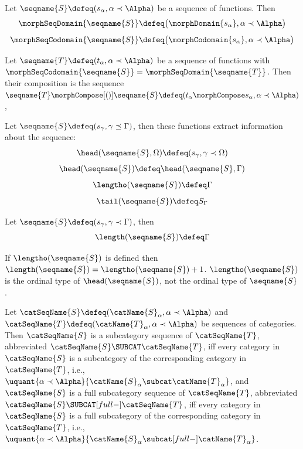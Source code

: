 \documentclass{article}
\begin{document}
\begin{definition}
Let $\seqname{S} \defeq (s_\alpha, \alpha \prec \Alpha)$ be a sequence
of functions. Then
\begin{equation}
\morphSeqDomain{\seqname{S}} \defeq \bigl ( \morphDomain{s_\alpha}, \alpha \prec \Alpha \bigr )
\end{equation}
\begin{equation}
\morphSeqCodomain{\seqname{S}} \defeq \bigl ( \morphCodomain{s_\alpha}, \alpha \prec \Alpha \bigr )
\end{equation}

Let $\seqname{T} \defeq (t_\alpha, \alpha \prec \Alpha)$ be a sequence
of functions with $\morphSeqCodomain{\seqname{S}} = \morphSeqDomain{\seqname{T}}$. Then
their composition is the sequence
$
  \seqname{T} \morphCompose[()] \seqname{S} \defeq
  (t_\alpha \morphCompose s_\alpha, \alpha \prec \Alpha)
$,

Let $\seqname{S} \defeq (s_\gamma, \gamma \preceq \Gamma)$, then these
functions extract information about the sequence:
\begin{equation}
\head(\seqname{S},\Omega) \defeq (s_\gamma, \gamma \prec \Omega)
\end{equation}
\begin{equation}
\head(\seqname{S}) \defeq \head(\seqname{S},\Gamma)
\end{equation}
\begin{equation}
\lengtho(\seqname{S}) \defeq \Gamma
\end{equation}
\begin{equation}
\tail(\seqname{S}) \defeq S_\Gamma
\end{equation}

Let $\seqname{S} \defeq (s_\gamma, \gamma \prec \Gamma)$, then
\begin{equation}
\length(\seqname{S}) \defeq \Gamma
\end{equation}

\begin{remark}
If $\lengtho(\seqname{S})$ is defined then
$\length(\seqname{S}) = \lengtho(\seqname{S}) + 1$.
$\lengtho(\seqname{S})$ is the ordinal type of
$\head(\seqname{S})$, not the ordinal type of $\seqname{S}$.
\end{remark}

Let $\catSeqName{S} \defeq (\catName{S}_\alpha, \alpha \prec \Alpha)$
and $\catSeqName{T} \defeq (\catName{T}_\alpha, \alpha \prec \Alpha)$ be
sequences of categories.  Then $\catSeqName{S}$ is a subcategory
sequence of $\catSeqName{T}$, abbreviated
$\catSeqName{S} \SUBCAT \catSeqName{T}$, iff every category in
$\catSeqName{S}$ is a subcategory of the corresponding category in
$\catSeqName{T}$, i.e.,
$
  \uquant%
    {\alpha \prec \Alpha}
    {\catName{S}_\alpha \subcat \catName{T}_\alpha}
$,
and $\catSeqName{S}$ is a full subcategory sequence of $\catSeqName{T}$,
abbreviated $\catSeqName{S} \SUBCAT[full-] \catSeqName{T}$, iff every
category in $\catSeqName{S}$ is a full subcategory of the corresponding
category in $\catSeqName{T}$, i.e.,
$
  \uquant%
    {\alpha \prec \Alpha}
    {\catName{S}_\alpha \subcat[full-] \catName{T}_\alpha}
$.


\end{definition}
\end{document}
